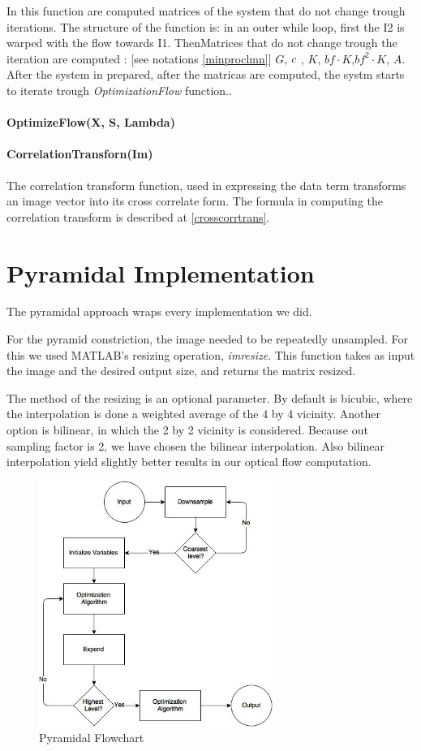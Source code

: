\documentclass[12pt,a4paper,twoside]{report}
\begin{document}
{ In this function are computed matrices of the system that do not change trough iterations. 
 The structure of the function is: in an outer while loop, first the I2 is warped with the flow towards I1. ThenMatrices that do not change trough the iteration are computed : [see notations \ref{minproclmn}]  $G$, $\boldmath c$ , $K$, $bf \cdot K$,$bf^2 \cdot K$, $A$. 
 After the system  in prepared, after the matricas are computed, the systm starts to iterate trough \textit{OptimizationFlow} function.. 

\paragraph{OptimizeFlow(X, S, Lambda)}



\paragraph{CorrelationTransforn(Im)}

The correlation transform function, used in expressing the data term transforms an image vector into its cross correlate form. The formula in computing the correlation transform is described at \ref{crosscorrtrans}.

 

\section{Pyramidal Implementation} \label{pyr}
The pyramidal approach wraps every implementation we did. 

For the pyramid constriction, the image needed to be repeatedly unsampled. For this we used MATLAB's resizing operation,  \textit{imresize}. This function takes as input the image and the desired output size, and returns the matrix resized. 

The method of the resizing is an optional parameter. By default is bicubic, where the interpolation is done a weighted average of the 4 by 4 vicinity. Another option is bilinear, in which the 2 by 2 vicinity is considered. Because  out sampling factor is 2, we have chosen the bilinear interpolation. Also bilinear interpolation yield slightly better results in our optical flow computation.
\begin{figure}
	\label{CTFflow}
	\centering
	\includegraphics[width = 3in]{img/ctfflow} 
	\caption{Pyramidal Flowchart}
\end{figure}

}
\end{document}
